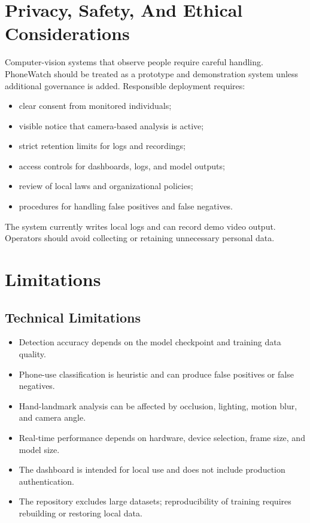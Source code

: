 \documentclass[12pt,a4paper]{report}
\newcommand{\projectname}{PhoneWatch}
\begin{document}
\chapter{Privacy, Safety, And Ethical Considerations}

Computer-vision systems that observe people require careful handling. \projectname{} should be treated as a prototype and demonstration system unless additional governance is added. Responsible deployment requires:

\begin{itemize}
  \item clear consent from monitored individuals;
  \item visible notice that camera-based analysis is active;
  \item strict retention limits for logs and recordings;
  \item access controls for dashboards, logs, and model outputs;
  \item review of local laws and organizational policies;
  \item procedures for handling false positives and false negatives.
\end{itemize}

The system currently writes local logs and can record demo video output. Operators should avoid collecting or retaining unnecessary personal data.

\chapter{Limitations}

\section{Technical Limitations}

\begin{itemize}
  \item Detection accuracy depends on the model checkpoint and training data quality.
  \item Phone-use classification is heuristic and can produce false positives or false negatives.
  \item Hand-landmark analysis can be affected by occlusion, lighting, motion blur, and camera angle.
  \item Real-time performance depends on hardware, device selection, frame size, and model size.
  \item The dashboard is intended for local use and does not include production authentication.
  \item The repository excludes large datasets; reproducibility of training requires rebuilding or restoring local data.
\end{itemize}
\end{document}
